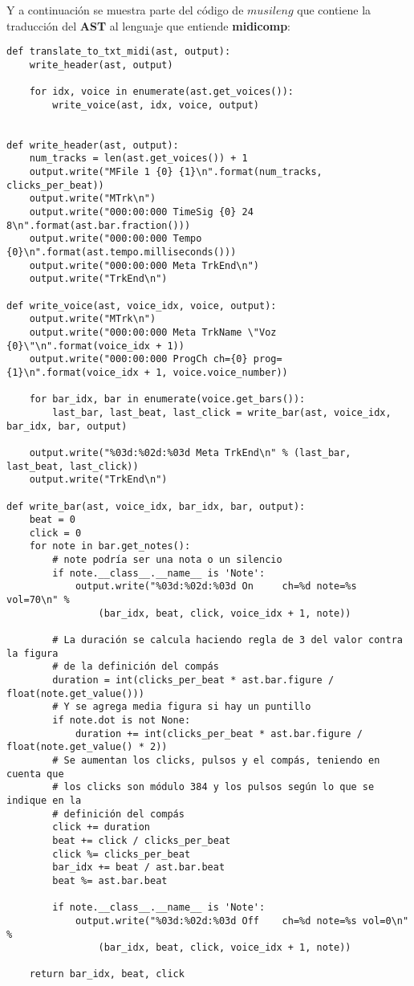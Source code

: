 \newpage

Y a continuación se muestra parte del código de $musileng$ que contiene la traducción del \textbf{AST} al lenguaje que entiende \textbf{midicomp}:

\begin{verbatim}
def translate_to_txt_midi(ast, output):
    write_header(ast, output)

    for idx, voice in enumerate(ast.get_voices()):
        write_voice(ast, idx, voice, output)


def write_header(ast, output):
    num_tracks = len(ast.get_voices()) + 1
    output.write("MFile 1 {0} {1}\n".format(num_tracks, clicks_per_beat))
    output.write("MTrk\n")
    output.write("000:00:000 TimeSig {0} 24 8\n".format(ast.bar.fraction()))
    output.write("000:00:000 Tempo {0}\n".format(ast.tempo.milliseconds()))
    output.write("000:00:000 Meta TrkEnd\n")
    output.write("TrkEnd\n")

def write_voice(ast, voice_idx, voice, output):
    output.write("MTrk\n")
    output.write("000:00:000 Meta TrkName \"Voz {0}\"\n".format(voice_idx + 1))
    output.write("000:00:000 ProgCh ch={0} prog={1}\n".format(voice_idx + 1, voice.voice_number))

    for bar_idx, bar in enumerate(voice.get_bars()):
        last_bar, last_beat, last_click = write_bar(ast, voice_idx, bar_idx, bar, output)

    output.write("%03d:%02d:%03d Meta TrkEnd\n" % (last_bar, last_beat, last_click))
    output.write("TrkEnd\n")

def write_bar(ast, voice_idx, bar_idx, bar, output):
    beat = 0
    click = 0
    for note in bar.get_notes():
        # note podría ser una nota o un silencio
        if note.__class__.__name__ is 'Note':
            output.write("%03d:%02d:%03d On     ch=%d note=%s vol=70\n" %
                (bar_idx, beat, click, voice_idx + 1, note))

        # La duración se calcula haciendo regla de 3 del valor contra la figura
        # de la definición del compás
        duration = int(clicks_per_beat * ast.bar.figure / float(note.get_value()))
        # Y se agrega media figura si hay un puntillo
        if note.dot is not None:
            duration += int(clicks_per_beat * ast.bar.figure / float(note.get_value() * 2))
        # Se aumentan los clicks, pulsos y el compás, teniendo en cuenta que
        # los clicks son módulo 384 y los pulsos según lo que se indique en la
        # definición del compás
        click += duration
        beat += click / clicks_per_beat
        click %= clicks_per_beat
        bar_idx += beat / ast.bar.beat
        beat %= ast.bar.beat

        if note.__class__.__name__ is 'Note':
            output.write("%03d:%02d:%03d Off    ch=%d note=%s vol=0\n" %
                (bar_idx, beat, click, voice_idx + 1, note))

    return bar_idx, beat, click
\end{verbatim}

\clearpage